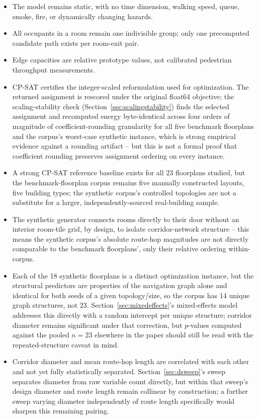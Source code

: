 \documentclass[11pt]{article}
\begin{document}
\begin{itemize}[leftmargin=*]
\item The model remains static, with no time dimension, walking speed, queue, smoke, fire, or dynamically changing hazards.
\item All occupants in a room remain one indivisible group; only one precomputed candidate path exists per room-exit pair.
\item Edge capacities are relative prototype values, not calibrated pedestrian throughput measurements.
\item CP-SAT certifies the integer-scaled reformulation used for optimization. The returned assignment is rescored under the original float64 objective; the scaling-stability check (Section~\ref{sec:scalingstability}) finds the selected assignment and recomputed energy byte-identical across four orders of magnitude of coefficient-rounding granularity for all five benchmark floorplans and the corpus's worst-case synthetic instance, which is strong empirical evidence against a rounding artifact -- but this is not a formal proof that coefficient rounding preserves assignment ordering on every instance.
\item A strong CP-SAT reference baseline exists for all 23 floorplans studied, but the benchmark-floorplan corpus remains five manually constructed layouts, five building types; the synthetic corpus's controlled topologies are not a substitute for a larger, independently-sourced real-building sample.
\item The synthetic generator connects rooms directly to their door without an interior room-tile grid, by design, to isolate corridor-network structure -- this means the synthetic corpus's absolute route-hop magnitudes are not directly comparable to the benchmark floorplans', only their relative ordering within-corpus.
\item Each of the 18 synthetic floorplans is a distinct optimization instance, but the structural predictors are properties of the navigation graph alone and identical for both seeds of a given topology/size, so the corpus has 14 unique graph structures, not 23. Section~\ref{sec:mixedeffects}'s mixed-effects model addresses this directly with a random intercept per unique structure; corridor diameter remains significant under that correction, but $p$-values computed against the pooled $n=23$ elsewhere in the paper should still be read with the repeated-structure caveat in mind.
\item Corridor diameter and mean route-hop length are correlated with each other and not yet fully statistically separated. Section~\ref{sec:dsweep}'s sweep separates diameter from raw variable count directly, but within that sweep's design diameter and route length remain collinear by construction; a further sweep varying diameter independently of route length specifically would sharpen this remaining pairing.

\end{itemize}
\end{document}
